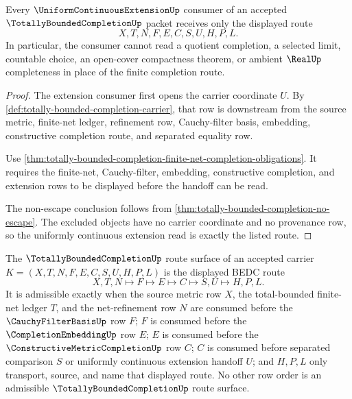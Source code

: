 \begin{theorem}
\label{thm:totally-bounded-completion-extension-handoff}
Every $\UniformContinuousExtensionUp$ consumer of an accepted $\TotallyBoundedCompletionUp$ packet receives only the displayed route
$$
X,T,N,F,E,C,S,U,H,P,L .
$$
In particular, the consumer cannot read a quotient completion, a selected limit, countable choice, an open-cover compactness theorem, or ambient $\RealUp$ completeness in place of the finite completion route.
\end{theorem}
\begin{proof}
The extension consumer first opens the carrier coordinate $U$. By \autoref{def:totally-bounded-completion-carrier}, that row is downstream from the source metric, finite-net ledger, refinement row, Cauchy-filter basis, embedding, constructive completion route, and separated equality row.

Use \autoref{thm:totally-bounded-completion-finite-net-completion-obligations}. It requires the finite-net, Cauchy-filter, embedding, constructive completion, and extension rows to be displayed before the handoff can be read.

The non-escape conclusion follows from \autoref{thm:totally-bounded-completion-no-escape}. The excluded objects have no carrier coordinate and no provenance row, so the uniformly continuous extension read is exactly the listed route.
\end{proof}

\begin{definition}
\label{def:totally-bounded-completion-route-surface}
The $\TotallyBoundedCompletionUp$ route surface of an accepted carrier
$K=(X,T,N,F,E,C,S,U,H,P,L)$ is the displayed BEDC route
$$
X,T,N \longmapsto F \longmapsto E \longmapsto C \longmapsto S,U \longmapsto H,P,L .
$$
It is admissible exactly when the source metric row $X$, the total-bounded finite-net ledger $T$, and the net-refinement row $N$ are consumed before the $\CauchyFilterBasisUp$ row $F$; $F$ is consumed before the $\CompletionEmbeddingUp$ row $E$; $E$ is consumed before the $\ConstructiveMetricCompletionUp$ row $C$; $C$ is consumed before separated comparison $S$ or uniformly continuous extension handoff $U$; and $H,P,L$ only transport, source, and name that displayed route. No other row order is an admissible $\TotallyBoundedCompletionUp$ route surface.
\end{definition}

